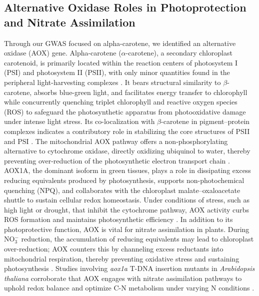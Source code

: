 \documentclass[10pt,letterpaper]{article}
\begin{document}

\subsection*{Alternative Oxidase Roles in Photoprotection and Nitrate Assimilation}

Through our GWAS focused on alpha-carotene, we  identified an alternative oxidase (AOX) gene. Alpha-carotene (\(\alpha\)-carotene), a secondary chloroplast carotenoid, is primarily located within the reaction centers of photosystem I (PSI) and photosystem II (PSII), with only minor quantities found in the peripheral light-harvesting complexes \citep{Young1989}. It bears structural similarity to \(\beta\)-carotene, absorbs blue-green light, and facilitates energy transfer to chlorophyll while concurrently quenching triplet chlorophyll and reactive oxygen species (ROS) to safeguard the photosynthetic apparatus from photooxidative damage under intense light stress. Its co-localization with \(\beta\)-carotene in pigment–protein complexes indicates a contributory role in stabilizing the core structures of PSII and PSI \citep{Young1989}. The mitochondrial AOX pathway offers a non-phosphorylating alternative to cytochrome oxidase, directly oxidizing ubiquinol to water, thereby preventing over-reduction of the photosynthetic electron transport chain \citep{Vishwakarma2015}. AOX1A, the dominant isoform in green tissues, plays a role in dissipating excess reducing equivalents produced by photosynthesis, supports non-photochemical quenching (NPQ), and collaborates with the chloroplast malate–oxaloacetate shuttle to sustain cellular redox homeostasis. Under conditions of stress, such as high light or drought, that inhibit the cytochrome pathway, AOX activity curbs ROS formation and maintains photosynthetic efficiency \citep{Vishwakarma2015}. In addition to its photoprotective function, AOX is vital for nitrate assimilation in plants. During NO\(_3^-\) reduction, the accumulation of reducing equivalents may lead to chloroplast over-reduction; AOX counters this by channeling excess reductants into mitochondrial respiration, thereby preventing oxidative stress and sustaining photosynthesis \citep{Gandin2014}. Studies involving \emph{aox1a} T-DNA insertion mutants in \emph{Arabidopsis thaliana} corroborate that AOX engages with nitrate assimilation pathways to uphold redox balance and optimize C-N metabolism under varying N conditions \citep{Gandin2014,Vishwakarma2015}.
\end{document}
